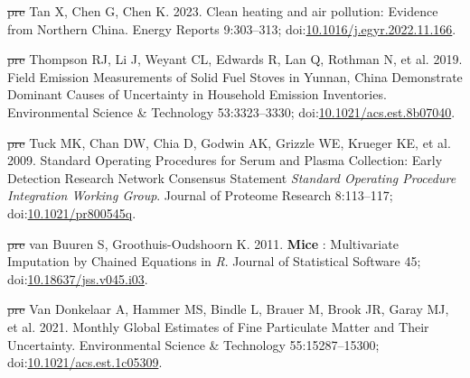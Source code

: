 \documentclass[
  letterpaper,
  DIV=11,
  numbers=noendperiod]{scrartcl}
\newlength{\cslhangindent}
\newenvironment{CSLReferences}[2] %
 {\begin{list}{}{%
  \setlength{\itemindent}{0pt} %
  \setlength{\leftmargin}{0pt} %
  \setlength{\parsep}{0pt} %
  \ifodd #1
   \setlength{\leftmargin}{\cslhangindent} %
   \setlength{\itemindent}{-1\cslhangindent} %
  \fi
  \setlength{\itemsep}{#2\baselineskip}}} %
 {\end{list}} %
\providecommand{\DIFdeltex}[1]{{\protect\color{red}\sout{#1}}}                      %
\providecommand{\DIFaddbegin}{} %
\providecommand{\DIFaddend}{} %
\providecommand{\DIFdelbegin}{} %
\providecommand{\DIFdelend}{} %
\providecommand{\DIFdel}[1]{\texorpdfstring{\DIFdeltex{#1}}{}} %
\newcommand{\DIFscaledelfig}{0.5}
\newlength{\DIFdelgraphicswidth} %
\newlength{\DIFdelgraphicsheight} %
\newcommand{\DIFaddincludegraphics}[2][]{{\color{blue}\fbox{\DIFOincludegraphics[#1]{#2}}}} %
\newcommand{\DIFdelincludegraphics}[2][]{%
\sbox{\DIFdelgraphicsbox}{\DIFOincludegraphics[#1]{#2}}%
\settoboxwidth{\DIFdelgraphicswidth}{\DIFdelgraphicsbox} %
\settoboxtotalheight{\DIFdelgraphicsheight}{\DIFdelgraphicsbox} %
\scalebox{\DIFscaledelfig}{%
\parbox[b]{\DIFdelgraphicswidth}{\usebox{\DIFdelgraphicsbox}\\[-\baselineskip] \rule{\DIFdelgraphicswidth}{0em}}\llap{\resizebox{\DIFdelgraphicswidth}{\DIFdelgraphicsheight}{%
\setlength{\unitlength}{\DIFdelgraphicswidth}%
\begin{picture}(1,1)%
\thicklines\linethickness{2pt} %
{\color[rgb]{1,0,0}\put(0,0){\framebox(1,1){}}}%
{\color[rgb]{1,0,0}\put(0,0){\line( 1,1){1}}}%
{\color[rgb]{1,0,0}\put(0,1){\line(1,-1){1}}}%
\end{picture}%
}\hspace*{3pt}}} %
} %
\DeclareRobustCommand{\DIFaddbegin}{\DIFOaddbegin \let\includegraphics\DIFaddincludegraphics} %
\DeclareRobustCommand{\DIFaddend}{\DIFOaddend \let\includegraphics\DIFOincludegraphics} %
\DeclareRobustCommand{\DIFdelbegin}{\DIFOdelbegin \let\includegraphics\DIFdelincludegraphics} %
\DeclareRobustCommand{\DIFdelend}{\DIFOaddend \let\includegraphics\DIFOincludegraphics} %
\begin{document}
\begin{CSLReferences}{1}{1}
\DIFdelbegin %
\DIFdel{pre}%
\DIFdelend \DIFaddbegin {}
\DIFaddend Tan X, Chen G, Chen K. 2023. Clean heating and air pollution: {Evidence}
from {Northern China}. Energy Reports 9:303--313;
doi:\href{https://doi.org/10.1016/j.egyr.2022.11.166}{10.1016/j.egyr.2022.11.166}.

\DIFdelbegin %
\DIFdel{pre}%
\DIFdelend \DIFaddbegin {}
\DIFaddend Thompson RJ, Li J, Weyant CL, Edwards R, Lan Q, Rothman N, et al. 2019.
Field {Emission Measurements} of {Solid Fuel Stoves} in {Yunnan}, {China
Demonstrate Dominant Causes} of {Uncertainty} in {Household Emission
Inventories}. Environmental Science \& Technology 53:3323--3330;
doi:\href{https://doi.org/10.1021/acs.est.8b07040}{10.1021/acs.est.8b07040}.

\DIFdelbegin %
\DIFdel{pre}%
\DIFdelend \DIFaddbegin {}
\DIFaddend Tuck MK, Chan DW, Chia D, Godwin AK, Grizzle WE, Krueger KE, et al.
2009. Standard {Operating Procedures} for {Serum} and {Plasma
Collection}: {Early Detection Research Network Consensus Statement}
{\emph{Standard Operating Procedure Integration Working Group}}. Journal
of Proteome Research 8:113--117;
doi:\href{https://doi.org/10.1021/pr800545q}{10.1021/pr800545q}.

\DIFdelbegin %
\DIFdel{pre}%
\DIFdelend \DIFaddbegin {}
\DIFaddend van Buuren S, Groothuis-Oudshoorn K. 2011. {\textbf{Mice}} :
{Multivariate Imputation} by {Chained Equations} in {\emph{R}}. Journal
of Statistical Software 45;
doi:\href{https://doi.org/10.18637/jss.v045.i03}{10.18637/jss.v045.i03}.

\DIFdelbegin %
\DIFdel{pre}%
\DIFdelend \DIFaddbegin {}
\DIFaddend Van Donkelaar A, Hammer MS, Bindle L, Brauer M, Brook JR, Garay MJ, et
al. 2021. Monthly {Global Estimates} of {Fine Particulate Matter} and
{Their Uncertainty}. Environmental Science \& Technology
55:15287--15300;
doi:\href{https://doi.org/10.1021/acs.est.1c05309}{10.1021/acs.est.1c05309}.


\end{CSLReferences}
\end{document}
